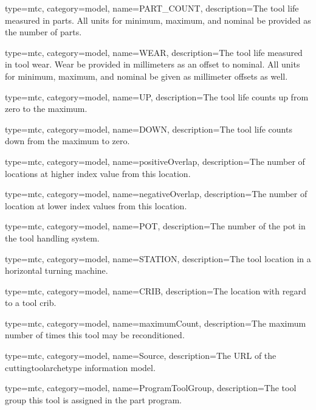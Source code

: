 {
  type=mtc,
  category=model,
  name={PART\_COUNT},
  description={The tool life measured in parts. All units for minimum, maximum, and nominal \MUST be provided as the number of parts.}
}


{
  type=mtc,
  category=model,
  name={WEAR},
  description={The tool life measured in tool wear. Wear \MUST be provided in millimeters as an offset to nominal. All units for minimum, maximum, and nominal \MUST be given as millimeter offsets as well. }
}


{
  type=mtc,
  category=model,
  name={UP},
  description={The tool life counts up from zero to the maximum.}
}


{
  type=mtc,
  category=model,
  name={DOWN},
  description={The tool life counts down from the maximum to zero.}
}


{
  type=mtc,
  category=model,
  name={positiveOverlap},
  description={The number of locations at higher index value from this location.}
}


{
  type=mtc,
  category=model,
  name={negativeOverlap},
  description={The number of location at lower index values from this location.}
}


{
  type=mtc,
  category=model,
  name={POT},
  description={The number of the pot in the tool handling system.}
}


{
  type=mtc,
  category=model,
  name={STATION},
  description={The tool location in a horizontal turning machine.}
}


{
  type=mtc,
  category=model,
  name={CRIB},
  description={The location with regard to a tool crib.}
}


{
  type=mtc,
  category=model,
  name={maximumCount},
  description={The maximum number of times this tool may be reconditioned.}
}


{
  type=mtc,
  category=model,
  name={Source},
  description={The URL of the \gls{cuttingtoolarchetype} \gls{information model}.}
}


{
  type=mtc,
  category=model,
  name={ProgramToolGroup},
  description={The tool group this tool is assigned in the part program.}
}


